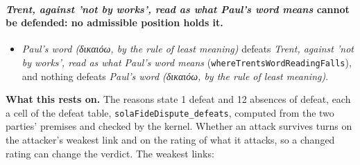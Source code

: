 \documentclass[11pt]{article}
\begin{document}
\paragraph{\emph{Trent, against 'not by works', read as what Paul's word means} cannot be defended: no admissible position holds it.}
\begin{itemize}
\item \emph{Paul's word (δικαιόω, by the rule of least meaning)} defeats \emph{Trent, against 'not by works', read as what Paul's word means} (\texttt{where\allowbreak{}Trents\allowbreak{}Word\allowbreak{}Reading\allowbreak{}Falls}), and nothing defeats \emph{Paul's word (δικαιόω, by the rule of least meaning)}.
\end{itemize}
\par\noindent\textbf{What this rests on.} The reasons state 1 defeat and 12 absences of defeat, each a cell of the defeat table, \texttt{sola\allowbreak{}Fide\allowbreak{}Dispute\_\allowbreak{}defeats}, computed from the two parties' premises and checked by the kernel. Whether an attack survives turns on the attacker's weakest link and on the rating of what it attacks, so a changed rating can change the verdict. The weakest links:
\end{document}
